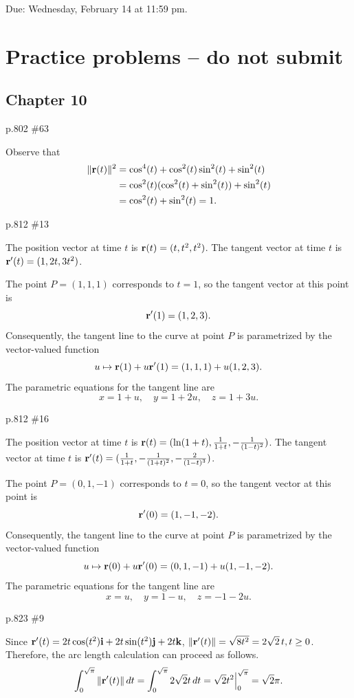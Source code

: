 \maketitle

Due: Wednesday, February 14 at 11:59 pm.

\section{Practice problems -- do not submit}
\subsection*{Chapter 10}
\begin{practice}p.802 \#63\end{practice}
\begin{pracsol}
  Observe that
  \[\begin{split}
    \|\mathbf r(t)\|^2 &= \cos^4(t)+\cos^2(t)\sin^2(t)+\sin^2(t) \\
    &= \cos^2(t)(\cos^2(t)+\sin^2(t))+\sin^2(t)\\
    &=\cos^2(t)+\sin^2(t)=1.
  \end{split}\]
\end{pracsol}
\begin{practice}p.812 \#13\end{practice}
\begin{pracsol}
  The position vector at time $t$ is $\mathbf r(t)=(t,t^2,t^2)$. The tangent vector at time $t$ is $\mathbf r'(t)=(1,2t,3t^2)$.

  The point $P=(1,1,1)$ corresponds to $t=1$, so the tangent vector at this point is
  \[\mathbf r'(1)=(1,2,3).\]
  Consequently, the tangent line to the curve at point $P$ is parametrized by the vector-valued function
  \[u\mapsto \mathbf r(1)+u\mathbf r'(1)=(1,1,1)+u(1,2,3).\]
  The parametric equations for the tangent line are
  \[x=1+u,\quad y=1+2u,\quad z=1+3u.\]
\end{pracsol}
\begin{practice}p.812 \#16\end{practice}
\begin{pracsol}
  The position vector at time $t$ is $\mathbf r(t)=(\ln(1+t),\frac1{1+t},-\frac1{(1-t)^2})$. The tangent vector at time $t$ is $\mathbf r'(t)=(\frac1{1+t},-\frac1{(1+t)^2},-\frac2{(1-t)^3})$.

  The point $P=(0,1,-1)$ corresponds to $t=0$, so the tangent vector at this point is
  \[\mathbf r'(0)=(1,-1,-2).\]
  Consequently, the tangent line to the curve at point $P$ is parametrized by the vector-valued function
  \[u\mapsto \mathbf r(0)+u\mathbf r'(0)=(0,1,-1)+u(1,-1,-2).\]
  The parametric equations for the tangent line are
  \[x=u,\quad y=1-u,\quad z=-1-2u.\]
\end{pracsol}
\begin{practice}p.823 \#9\end{practice}
\begin{pracsol}
  Since $\mathbf r'(t)=2t\cos(t^2)\mathbf i+2t\sin(t^2)\mathbf j+2t\mathbf k$, $\|\mathbf r'(t)\|=\sqrt{8t^2}=2\sqrt2\,t,t\geq 0$. Therefore, the arc length calculation can proceed as follows.
  \[\int_0^{\sqrt\pi}\|\mathbf r'(t)\|\,dt=\int_0^{\sqrt\pi}2\sqrt2t\,dt=\sqrt2t^2\Big|_0^{\sqrt\pi}=\sqrt2\pi.\]
\end{pracsol}


